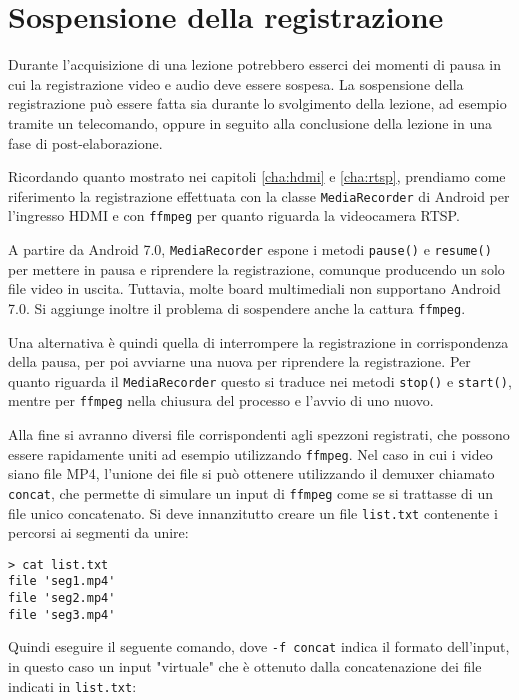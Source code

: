 \chapter{Sospensione della registrazione}
\label{cha:pausa}

Durante l'acquisizione di una lezione potrebbero esserci dei momenti di pausa in cui la registrazione video e audio deve essere sospesa. La sospensione della registrazione può essere fatta sia durante lo svolgimento della lezione, ad esempio tramite un telecomando, oppure in seguito alla conclusione della lezione in una fase di post-elaborazione.

Ricordando quanto mostrato nei capitoli \ref{cha:hdmi} e \ref{cha:rtsp}, prendiamo come riferimento la registrazione effettuata con la classe \texttt{MediaRecorder} di Android per l'ingresso HDMI e con \texttt{ffmpeg} per quanto riguarda la videocamera RTSP.

A partire da Android 7.0, \texttt{MediaRecorder} espone i metodi \texttt{pause()} e \texttt{resume()} per mettere in pausa e riprendere la registrazione, comunque producendo un solo file video in uscita. Tuttavia, molte board multimediali non supportano Android 7.0. Si aggiunge inoltre il problema di sospendere anche la cattura \texttt{ffmpeg}.

Una alternativa è quindi quella di interrompere la registrazione in corrispondenza della pausa, per poi avviarne una nuova per riprendere la registrazione. Per quanto riguarda il \texttt{MediaRecorder} questo si traduce nei metodi \texttt{stop()} e \texttt{start()}, mentre per \texttt{ffmpeg} nella chiusura del processo e l'avvio di uno nuovo.

Alla fine si avranno diversi file corrispondenti agli spezzoni registrati, che possono essere rapidamente uniti ad esempio utilizzando \texttt{ffmpeg}. Nel caso in cui i video siano file MP4, l'unione dei file si può ottenere utilizzando il demuxer chiamato \texttt{concat}, che permette di simulare un input di \texttt{ffmpeg} come se si trattasse di un file unico concatenato.\cite{ffmpeg} Si deve innanzitutto creare un file \texttt{list.txt} contenente i percorsi ai segmenti da unire:

\begin{verbatim}
> cat list.txt
file 'seg1.mp4'
file 'seg2.mp4'
file 'seg3.mp4'
\end{verbatim}

Quindi eseguire il seguente comando, dove \texttt{-f concat} indica il formato dell'input, in questo caso un input "virtuale" che è ottenuto dalla concatenazione dei file indicati in \texttt{list.txt}:

